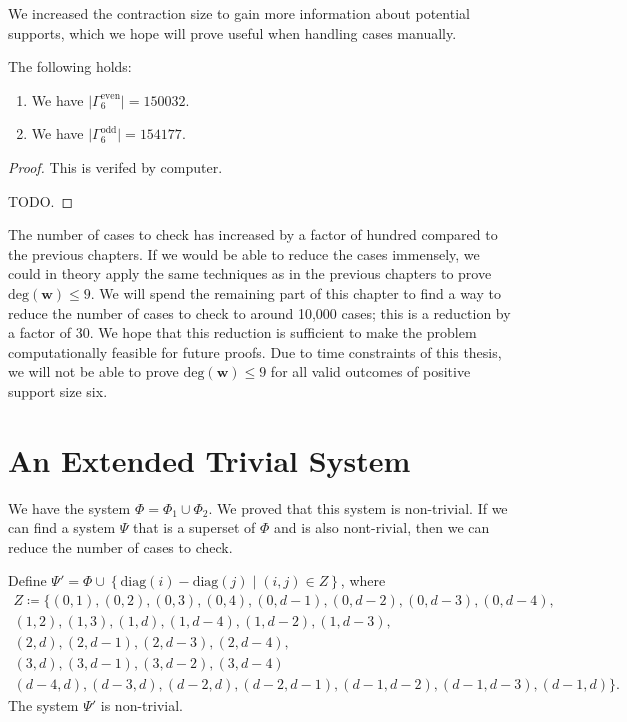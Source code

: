 We increased the contraction size to gain more information about potential supports, which we hope will prove useful when handling cases manually.

\begin{proposition}
    The following holds:
    \begin{enumerate}
        \item We have \( \lvert \Gamma^{\mathrm{even}}_6 \rvert  = 150032\).
        \item We have \( \lvert \Gamma^{\mathrm{odd}}_6 \rvert  = 154177\).
    \end{enumerate}
\end{proposition}

\begin{proof}
    This is verifed by computer. 
    
    TODO. 
\end{proof}

The number of cases to check has increased by a factor of hundred compared to the previous chapters. If we would be able to reduce the cases immensely, we could in theory apply the same techniques as in the previous chapters to prove \( \mathrm{deg}(\mathbf w) \leq 9 \). We will spend the remaining part of this chapter to find a way to reduce the number of cases to check to around 10,000 cases; this is a reduction by a factor of 30. We hope that this reduction is sufficient to make the problem computationally feasible for future proofs. Due to time constraints of this thesis, we will not be able to prove \( \mathrm{deg}(\mathbf w) \leq 9 \) for all valid outcomes of positive support size six.

\section{An Extended Trivial System}

We have the system \( \Phi = \Phi_1 \cup \Phi_2 \). We proved that this system is non-trivial. If we can find a system \( \Psi \) that is a superset of \( \Phi \) and is also nont-rivial, then we can reduce the number of cases to check. 

\begin{proposition}
    Define \( \Psi' = \Phi \cup \left\{ \mathrm{diag}(i) - \mathrm{diag}(j) \mid (i,j) \in Z \right\} \), where 
    \begin{gather*}
        Z \coloneqq \{ (0,1), (0,2), (0,3), (0,4), (0,d-1), (0,d-2), (0,d-3), (0,d-4),\\ (1,2), (1,3), (1, d), (1,d-4), (1,d-2), (1,d-3),\\ (2,d), (2,d-1), (2,d-3), (2, d-4),\\ (3,d), (3,d-1), (3,d-2), (3, d-4)\\
        (d-4,d), (d-3,d), (d-2,d), (d-2,d-1), (d-1,d-2), (d-1,d-3), (d-1,d)\}.
    \end{gather*}
    The system \( \Psi' \) is non-trivial.
\end{proposition}

